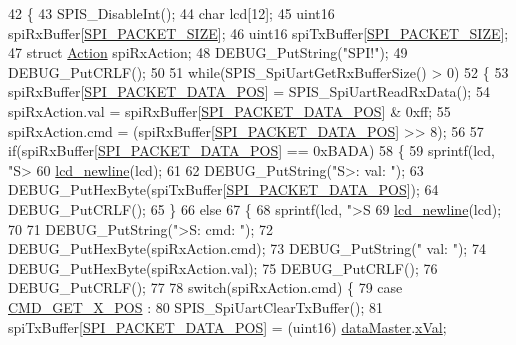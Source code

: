 \begin{DoxyCode}
42 \{
43   SPIS\_DisableInt();
44   \textcolor{keywordtype}{char} lcd[12];
45   uint16 spiRxBuffer[\hyperlink{spi_8h_aea54fc09a960e5a1b7096374f3eebee4}{SPI\_PACKET\_SIZE}];
46   uint16 spiTxBuffer[\hyperlink{spi_8h_aea54fc09a960e5a1b7096374f3eebee4}{SPI\_PACKET\_SIZE}];
47   \textcolor{keyword}{struct }\hyperlink{queue_8h_df/d8c/struct_action}{Action} spiRxAction;
48   DEBUG\_PutString(\textcolor{stringliteral}{"SPI!"});
49   DEBUG\_PutCRLF();
50 
51   \textcolor{keywordflow}{while}(SPIS\_SpiUartGetRxBufferSize() > 0)
52   \{
53     spiRxBuffer[\hyperlink{spi_8h_a5ffe58623f478b7b960a1349530a6655}{SPI\_PACKET\_DATA\_POS}] = SPIS\_SpiUartReadRxData();
54     spiRxAction.val = spiRxBuffer[\hyperlink{spi_8h_a5ffe58623f478b7b960a1349530a6655}{SPI\_PACKET\_DATA\_POS}] & 0xff;
55     spiRxAction.cmd = (spiRxBuffer[\hyperlink{spi_8h_a5ffe58623f478b7b960a1349530a6655}{SPI\_PACKET\_DATA\_POS}] >> 8);
56     
57     \textcolor{keywordflow}{if}(spiRxBuffer[\hyperlink{spi_8h_a5ffe58623f478b7b960a1349530a6655}{SPI\_PACKET\_DATA\_POS}] == 0xBADA)
58     \{
59       sprintf(lcd, \textcolor{stringliteral}{"S> %
60       \hyperlink{lcd_8h_a507dd352aee8161dc556e3d1439a2be2}{lcd\_newline}(lcd);
61       
62       DEBUG\_PutString(\textcolor{stringliteral}{"S>: val: "});
63       DEBUG\_PutHexByte(spiTxBuffer[\hyperlink{spi_8h_a5ffe58623f478b7b960a1349530a6655}{SPI\_PACKET\_DATA\_POS}]);
64       DEBUG\_PutCRLF();
65     \}
66     \textcolor{keywordflow}{else}
67     \{
68       sprintf(lcd, \textcolor{stringliteral}{">S %
69       \hyperlink{lcd_8h_a507dd352aee8161dc556e3d1439a2be2}{lcd\_newline}(lcd);
70       
71       DEBUG\_PutString(\textcolor{stringliteral}{">S: cmd: "});
72       DEBUG\_PutHexByte(spiRxAction.cmd);
73       DEBUG\_PutString(\textcolor{stringliteral}{" val: "});
74       DEBUG\_PutHexByte(spiRxAction.val);
75       DEBUG\_PutCRLF();
76       DEBUG\_PutCRLF();
77       
78       \textcolor{keywordflow}{switch}(spiRxAction.cmd) \{
79         \textcolor{keywordflow}{case} \hyperlink{handler_8h_aa50e083669624eeaef782ebc867008f9}{CMD\_GET\_X\_POS} :
80           SPIS\_SpiUartClearTxBuffer();
81           spiTxBuffer[\hyperlink{spi_8h_a5ffe58623f478b7b960a1349530a6655}{SPI\_PACKET\_DATA\_POS}] = (uint16)
      \hyperlink{data_8h_a6b1a8871e30b304a6f5764c44d89e489}{dataMaster}.\hyperlink{data_8h_a7849f509240fa25127fcda8c5009f02b}{xVal};
}}
\end{DoxyCode}

